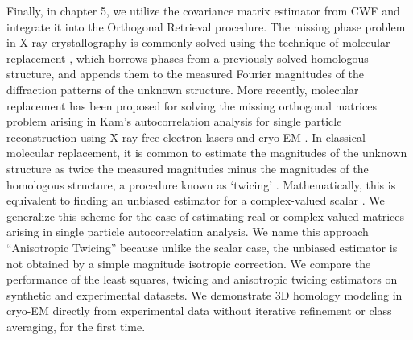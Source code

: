 Finally, in chapter 5, we utilize the covariance matrix estimator from CWF and integrate it into the Orthogonal Retrieval procedure.
The missing phase problem in X-ray crystallography is commonly solved using the
technique of molecular replacement \cite{rossmann62, rossmann01, scapin13}, 
which borrows phases from a previously
solved homologous structure, and appends them to the measured Fourier magnitudes
of the diffraction patterns of the unknown structure. More recently, molecular 
replacement has been proposed for solving the missing orthogonal matrices 
problem arising in Kam's autocorrelation analysis \cite{kam1977, kam1980} for 
single particle reconstruction using X-ray free electron lasers 
\cite{Saldin2009, Hosseinizadeh2015, Starodub12ncom} and cryo-EM \cite{Bhamre2014}. In classical
molecular replacement, it is common to estimate the magnitudes of the unknown 
structure as twice the measured magnitudes minus the magnitudes of
the homologous structure, a procedure known as 
`twicing' \cite{tukey77}. Mathematically, this is equivalent to finding an 
unbiased estimator for
a complex-valued scalar \cite{Main1979}. We generalize this scheme for the
case of estimating real or complex valued matrices arising in single particle 
autocorrelation analysis. We name this approach ``Anisotropic Twicing'' 
because unlike the scalar case, the unbiased estimator is not obtained by a 
simple magnitude isotropic correction. We compare the performance of the least 
squares, twicing and anisotropic twicing estimators on synthetic and 
experimental datasets. We demonstrate 3D homology modeling in cryo-EM directly from experimental data without iterative refinement or class averaging, for the first time.
